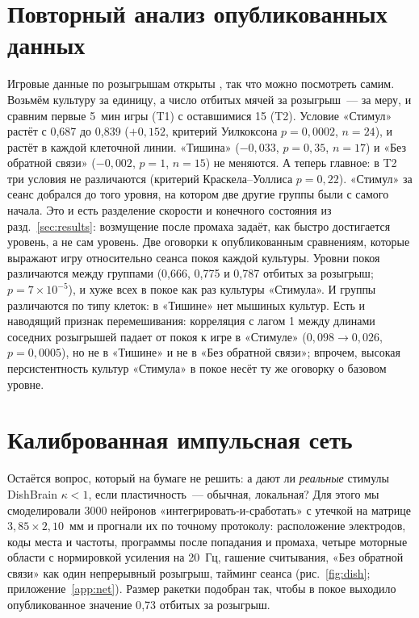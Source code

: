 \documentclass[pre,twocolumn,superscriptaddress,showpacs=false,amsmath,amssymb,nofootinbib]{revtex4-2}
\begin{document}
\section{Повторный анализ опубликованных данных}\label{sec:data}

Игровые данные по розыгрышам открыты \cite{OSF2022}, так что можно посмотреть самим. Возьмём культуру за единицу, а число отбитых мячей за розыгрыш~--- за меру, и сравним первые 5~мин игры (T1) с оставшимися 15 (T2). Условие «Стимул» растёт с 0{,}687 до 0{,}839 ($+0{,}152$, критерий Уилкоксона $p=0{,}0002$, $n=24$), и растёт в каждой клеточной линии. «Тишина» ($-0{,}033$, $p=0{,}35$, $n=17$) и «Без обратной связи» ($-0{,}002$, $p=1$, $n=15$) не меняются. А теперь главное: в T2 три условия не различаются (критерий Краскела--Уоллиса $p=0{,}22$). «Стимул» за сеанс добрался до того уровня, на котором две другие группы были с самого начала. Это и есть разделение скорости и конечного состояния из разд.~\ref{sec:results}: возмущение после промаха задаёт, как быстро достигается уровень, а не сам уровень. Две оговорки к опубликованным сравнениям, которые выражают игру относительно сеанса покоя каждой культуры. Уровни покоя различаются между группами (0{,}666, 0{,}775 и 0{,}787 отбитых за розыгрыш; $p=7\times10^{-5}$), и хуже всех в покое как раз культуры «Стимула». И группы различаются по типу клеток: в «Тишине» нет мышиных культур. Есть и наводящий признак перемешивания: корреляция с лагом 1 между длинами соседних розыгрышей падает от покоя к игре в «Стимуле» ($0{,}098\to0{,}026$, $p=0{,}0005$), но не в «Тишине» и не в «Без обратной связи»; впрочем, высокая персистентность культур «Стимула» в покое несёт ту же оговорку о базовом уровне.

\section{Калиброванная импульсная сеть}\label{sec:net}

Остаётся вопрос, который на бумаге не решить: а дают ли \emph{реальные} стимулы DishBrain $\kappa<1$, если пластичность~--- обычная, локальная? Для этого мы смоделировали 3000 нейронов «интегрировать-и-сработать» с утечкой на матрице $3{,}85\times2{,}10$~мм и прогнали их по точному протоколу: расположение электродов, коды места и частоты, программы после попадания и промаха, четыре моторные области с нормировкой усиления на 20~Гц, гашение считывания, «Без обратной связи» как один непрерывный розыгрыш, тайминг сеанса (рис.~\ref{fig:dish}; приложение~\ref{app:net}). Размер ракетки подобран так, чтобы в покое выходило опубликованное значение 0{,}73 отбитых за розыгрыш.
\end{document}

